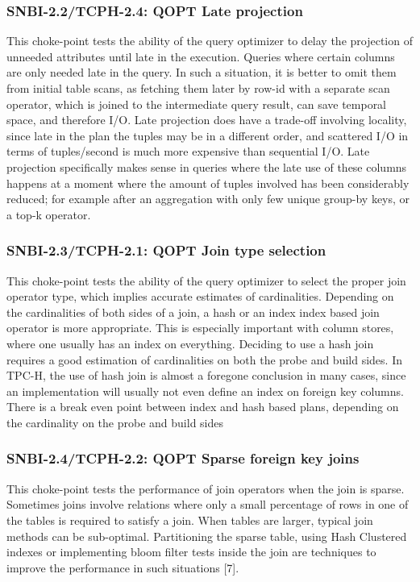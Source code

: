 \subsubsection{SNBI-2.2/TCPH-2.4: QOPT Late projection}
\label{choke_point_2.2}
This choke-point tests the ability of the query optimizer to delay the projection of unneeded attributes until late in the execution. Queries where certain columns are only needed late in the query. 
In such a situation, it is better to omit them from initial table scans, as fetching them later by row-id with a separate scan operator, which is joined to the intermediate query result, can save temporal space, and therefore I/O. 
Late projection does have a trade-off involving locality, since late in the plan the tuples may be in a different order, and scattered I/O in terms of tuples/second is much more expensive than sequential I/O. 
Late projection specifically makes sense in queries where the late use of these columns happens at a moment where the amount of tuples involved has been considerably reduced;  
for example after an aggregation with only few unique group-by keys, or a top-k operator.

\subsubsection{SNBI-2.3/TCPH-2.1: QOPT Join type selection}
\label{choke_point_2.3}
This choke-point tests the ability of the query optimizer to select the proper join operator type, which implies accurate estimates of cardinalities. 
Depending on the cardinalities of both sides of a join, a hash or an index index based join operator is more appropriate. 
This is especially important with column stores, where one usually has an index on everything. Deciding to use a hash join requires a good estimation of cardinalities on both the probe and build sides. 
In TPC-H, the use of hash join is almost a foregone conclusion in many cases, since an implementation will usually not even define an index on foreign key columns. 
There is a break even point between index and hash based plans, depending on the cardinality on the probe and build sides

\subsubsection{SNBI-2.4/TCPH-2.2: QOPT Sparse foreign key joins}
\label{choke_point_2.4}
This choke-point tests the performance of join operators when the join is sparse. Sometimes joins involve relations where only a small percentage of rows in one of the tables is required to satisfy a join. When tables are larger, typical join methods can be sub-optimal. Partitioning the sparse table, using Hash Clustered indexes or implementing bloom filter tests inside the join are techniques to improve the performance in such situations [7].

